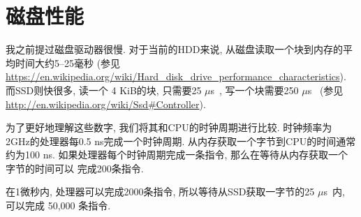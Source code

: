 \documentclass[12pt]{book}
\begin{document}
{%
\section{磁盘性能}

\newcommand{\mus}{$\mu$s~}

%
我之前提过磁盘驱动器很慢. 对于当前的HDD来说, 
从磁盘读取一个块到内存的平均时间大约5--25毫秒
(参见 \url{https://en.wikipedia.org/wiki/Hard_disk_drive_performance_characteristics}).
而SSD则快很多, 读一个 4 KiB的块, 只需要25 \mus, 写一个块需要250 \mus
(参见 \url{http://en.wikipedia.org/wiki/Ssd#Controller}).

为了更好地理解这些数字, 我们将其和CPU的时钟周期进行比较.
时钟频率为 2GHz的处理器每0.5 ns完成一个时钟周期.
从内存获取一个字节到CPU的时间通常约为100 ns. 
如果处理器每个时钟周期完成一条指令, 那么在等待从内存获取一个字节的时间可以
完成200条指令.

%
%
在1微秒内, 处理器可以完成2000条指令, 
所以等待从SSD获取一字节的25 \mus 内, 可以完成 50,000 条指令.

}
\end{document}
